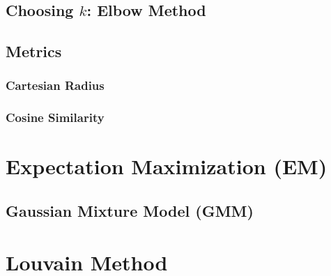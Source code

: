\subsection{Choosing \texorpdfstring{$k$}{k}: Elbow Method}
\label{cluster:kMean:elbow}

\subsection{Metrics}
\label{cluster:kMean:metrics}

\subsubsection{Cartesian Radius}
\label{cluster:kMean:metrics:cartesian}


\subsubsection{Cosine Similarity}
\label{cluster:kMean:metrics:cos}


\section{Expectation Maximization (EM)}
\label{cluster:EM}

\subsection{Gaussian Mixture Model (GMM)}
\label{cluster:EM:GMM}

\section{Louvain Method}
\label{cluster:louvain}

